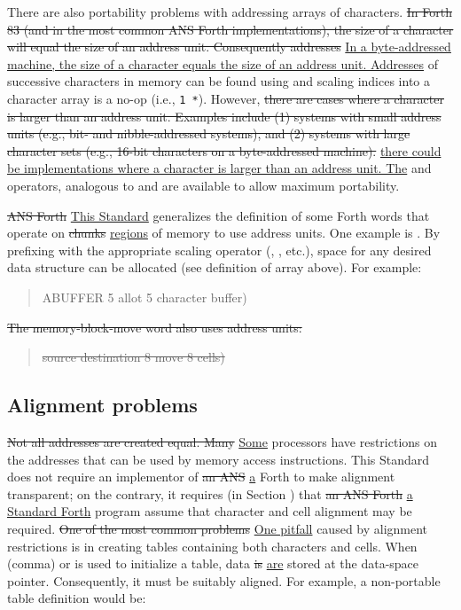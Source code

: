 There are also portability problems with addressing arrays of
characters. 
\sout{In Forth 83 (and in the most common ANS Forth
implementations), the size of a character will equal the size of an
address unit. Consequently addresses}
\uline{In a byte-addressed machine, the size of a character equals the
size of an address unit.  Addresses}
of successive characters
in memory can be found using  and scaling indices into a character
array is a no-op (i.e., \texttt{1 *}). However,
\sout{there are cases where a character is larger than an address unit. Examples include (1)
systems with small address units (e.g., bit- and nibble-addressed
systems), and (2) systems with large character sets (e.g., 16-bit
characters on a byte-addressed machine).}
\uline{there could be implementations where a character is larger than
an address unit.  The}
 and 
operators, analogous to  and  are available
to allow maximum portability.

\sout{ANS Forth} \uline{This Standard} generalizes the definition of some Forth words that operate
on \sout{chunks} \uline{regions} of memory to use address units. One example is
.  By prefixing  with the appropriate scaling operator
(, , etc.), space for any desired data structure can
be allocated (see definition of array above). For example:
\begin{quote}\ttfamily
	 ABUFFER 5  
	 \textrm{allot 5 character buffer})
\end{quote}

\sout{The memory-block-move word also uses address units:}
\begin{quote}\ttfamily
\sout{source destination 8    move 8 cells)}
\end{quote}


\subsection{Alignment problems} %

\sout{Not all addresses are created equal. Many} \uline{Some} processors have restrictions on the addresses that can be used by
memory access instructions. This Standard does not require an
implementor of \sout{an ANS} \uline{a} Forth to make alignment transparent; on the
contrary, it requires (in Section ) that
\sout{an ANS Forth} \uline{a Standard Forth} program assume that character and cell alignment may be
required.
\sout{One of the most common problems} \uline{One pitfall} caused by alignment restrictions
is in creating tables containing both characters and cells. When
\word{,} (comma) or  is used to initialize a table, data
\sout{is} \uline{are} stored at the data-space pointer. Consequently, it must be
suitably aligned. For example, a non-portable table definition
would be:


